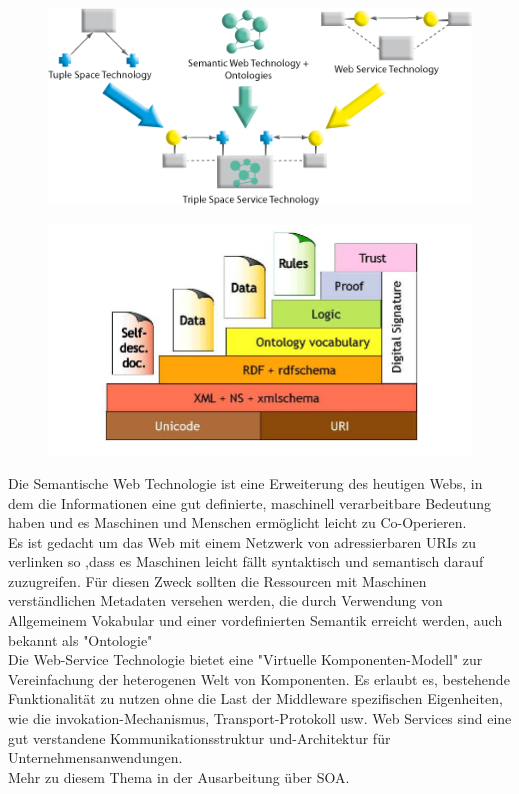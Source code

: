 \documentclass[a4paper,12pt]{scrreprt}
\begin{document}
		

\begin{figure}[h]
\centering
\includegraphics[width=0.7\linewidth]{./tripcom_overview2}
\caption{}
\label{fig:tripcom_overview2}
\end{figure}
\begin{figure}[h]
\centering
\includegraphics[width=0.7\linewidth]{./Semantic_Web_www_tripcom_org_docs_coordination07_paper}
\caption{}
\label{fig:Semantic_Web_www_tripcom_org_docs_coordination07_paper}
\end{figure} %
		
		
	
		
			Die Semantische Web Technologie ist eine Erweiterung des heutigen Webs, in dem die Informationen eine gut definierte, maschinell verarbeitbare Bedeutung haben und es Maschinen und Menschen ermöglicht leicht zu Co-Operieren.\\
				Es ist gedacht um das Web mit einem Netzwerk von adressierbaren URIs zu verlinken so ,dass es Maschinen leicht fällt syntaktisch und semantisch darauf zuzugreifen.
				Für diesen Zweck sollten die Ressourcen mit Maschinen verständlichen Metadaten versehen werden, die durch Verwendung von Allgemeinem Vokabular und einer vordefinierten Semantik erreicht werden, auch bekannt als "Ontologie"
				\\
			
	

		
			
		
		
		Die Web-Service Technologie bietet eine 
		"Virtuelle Komponenten-Modell" zur Vereinfachung der 
		heterogenen Welt von Komponenten. Es  erlaubt es, bestehende Funktionalität zu nutzen 
		ohne die Last der Middleware spezifischen Eigenheiten, wie die invokation-Mechanismus, Transport-Protokoll usw. Web Services sind eine gut verstandene Kommunikationsstruktur und-Architektur für Unternehmensanwendungen.\\ Mehr zu diesem Thema in der Ausarbeitung über SOA.
		
\end{document}
